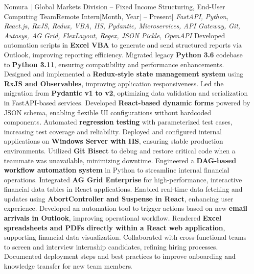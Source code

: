 \resumeSubheading
  {Nomura | Global Markets Division – Fixed Income Structuring, End-User Computing Team}{Remote}
  {Intern}{[Month, Year] -- Present}{| \textit{FastAPI, Python, React.js, RxJS, Redux, VBA, IIS, Pydantic, Microservices, API Gateway, Git, Autosys, AG Grid, FlexLayout, Regex, JSON Pickle, OpenAPI}}
  \resumeItemListStart
    {Developed automation scripts in \textbf{Excel VBA} to generate and send structured reports via Outlook, improving reporting efficiency.}
    {Migrated legacy \textbf{Python 3.6} codebase to \textbf{Python 3.11}, ensuring compatibility and performance enhancements.}
    {Designed and implemented a \textbf{Redux-style state management system} using \textbf{RxJS and Observables}, improving application responsiveness.}
    {Led the migration from \textbf{Pydantic v1 to v2}, optimizing data validation and serialization in FastAPI-based services.}
    {Developed \textbf{React-based dynamic forms} powered by JSON schema, enabling flexible UI configurations without hardcoded components.}
    {Automated \textbf{regression testing} with parameterized test cases, increasing test coverage and reliability.}
    {Deployed and configured internal applications on \textbf{Windows Server with IIS}, ensuring stable production environments.}
    {Utilized \textbf{Git Bisect} to debug and restore critical code when a teammate was unavailable, minimizing downtime.}
    {Engineered a \textbf{DAG-based workflow automation system} in Python to streamline internal financial operations.}
    {Integrated \textbf{AG Grid Enterprise} for high-performance, interactive financial data tables in React applications.}
    {Enabled real-time data fetching and updates using \textbf{AbortController and Suspense in React}, enhancing user experience.}
    {Developed an automation tool to trigger actions based on new \textbf{email arrivals in Outlook}, improving operational workflow.}
    {Rendered \textbf{Excel spreadsheets and PDFs directly within a React web application}, supporting financial data visualization.}
    {Collaborated with cross-functional teams to screen and interview internship candidates, refining hiring processes. Documented deployment steps and best practices to improve onboarding and knowledge transfer for new team members.}
  \resumeItemListEnd
